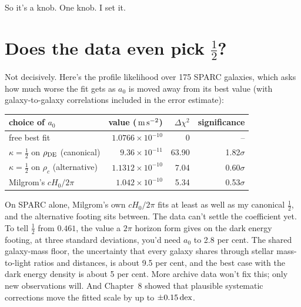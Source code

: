 So it's a knob. One knob. I set it.




\section{Does the data even pick \texorpdfstring{$\tfrac12$}{1/2}?}

Not decisively. Here's the profile likelihood over 175 SPARC galaxies, which asks how much worse the fit gets as $a_0$ is moved away from its best value (with galaxy-to-galaxy correlations included in the error estimate):

\begin{center}\small
\begin{tabular}{@{}lrrr@{}}
\toprule
choice of $a_0$ & value ($\,\mathrm{m\,s^{-2}}$) & $\Delta\chi^2$ & significance\\
\midrule
free best fit & $1.0766\times10^{-10}$ & 0 & --\\
$\kappa=\tfrac12$ on $\rho_{\rm DE}$ (canonical) & $9.36\times10^{-11}$ & 63.90 & 1.82$\sigma$\\
$\kappa=\tfrac12$ on $\rho_c$ (alternative) & $1.1312\times10^{-10}$ & 7.04 & 0.60$\sigma$\\
Milgrom's $cH_0/2\pi$ & $1.042\times10^{-10}$ & 5.34 & 0.53$\sigma$\\
\bottomrule
\end{tabular}
\end{center}


\begin{honestbox}
On SPARC alone, Milgrom's own $cH_0/2\pi$ fits at least as well as my canonical $\tfrac12$, and the alternative footing sits between. The data can't settle the coefficient yet. To tell $\tfrac12$ from $0.461$, the value a $2\pi$ horizon form gives on the dark energy footing, at three standard deviations, you'd need $a_0$ to 2.8 per cent. The shared galaxy-mass floor, the uncertainty that every galaxy shares through stellar mass-to-light ratios and distances, is about 9.5 per cent, and the best case with the dark energy density is about 5 per cent. More archive data won't fix this; only new observations will. And Chapter~8 showed that plausible systematic corrections move the fitted scale by up to $\pm0.15\,\mathrm{dex}$.
\end{honestbox}

